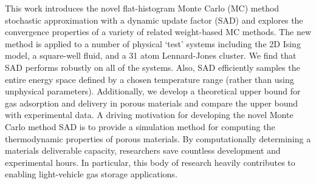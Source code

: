 This work introduces the novel flat-histogram Monte Carlo (MC) method
stochastic approximation with a dynamic update factor (SAD) and explores the
convergence properties of a variety of related weight-based MC methods. The new
method is applied to a number of physical `test’ systems including the 2D Ising
model, a square-well fluid, and a 31 atom Lennard-Jones cluster. We find that
SAD performs robustly on all of the systems. Also, SAD efficiently samples the
entire energy space defined by a chosen temperature range (rather than using
unphysical parameters). Additionally, we develop a theoretical upper bound for
gas adsorption and delivery in porous materials and compare the upper bound with
experimental data.
A driving motivation for developing the novel Monte Carlo method SAD is to
provide a simulation method for computing the thermodynamic properties of
porous materials. By computationally determining a materials deliverable
capacity, researchers save countless development and experimental hours. In
particular, this body of research heavily contributes to enabling light-vehicle
gas storage applications.